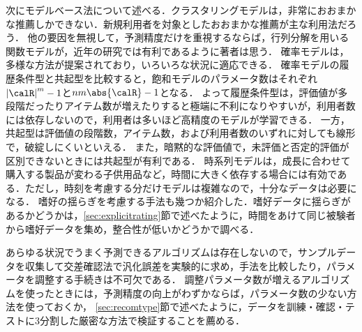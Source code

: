 次にモデルベース法について述べる．クラスタリングモデルは，非常におおまかな推薦しかできない．新規利用者を対象としたおおまかな推薦が主な利用法だろう．
他の要因を無視して，予測精度だけを重視するならば，行列分解を用いる関数モデルが，近年の研究では有利であるように著者は思う．
確率モデルは，多様な方法が提案されており，いろいろな状況に適応できる．
確率モデルの履歴条件型と共起型を比較すると，飽和モデルのパラメータ数はそれぞれ${|\calR|}^m-1$と$nm\abs{\calR}-1$となる．
よって履歴条件型は，評価値が多段階だったりアイテム数が増えたりすると極端に不利になりやすいが，利用者数には依存しないので，利用者は多いほど高精度のモデルが学習できる．
一方，共起型は評価値の段階数，アイテム数，および利用者数のいずれに対しても線形で，破綻しにくいといえる．
また，暗黙的な評価値で，未評価と否定的評価が区別できないときには共起型が有利である．
時系列モデルは，成長に合わせて購入する製品が変わる子供用品など，時間に大きく依存する場合には有効である．ただし，時刻を考慮する分だけモデルは複雑なので，十分なデータは必要になる．
嗜好の揺らぎを考慮する手法も幾つか紹介した．嗜好データに揺らぎがあるかどうかは，\ref{sec:explicitrating}節で述べたように，時間をあけて同じ被験者から嗜好データを集め，整合性が低いかどうかで調べる．

あらゆる状況でうまく予測できるアルゴリズムは存在しないので，サンプルデータを収集して交差確認法で汎化誤差を実験的に求め，手法を比較したり，パラメータを調整する手続きは不可欠である．
調整パラメータ数が増えるアルゴリズムを使ったときには，予測精度の向上がわずかならば，パラメータ数の少ない方法を使っておくか，
\ref{sec:recomtype}節で述べたように，データを訓練・確認・テストに3分割した厳密な方法で検証することを薦める．

